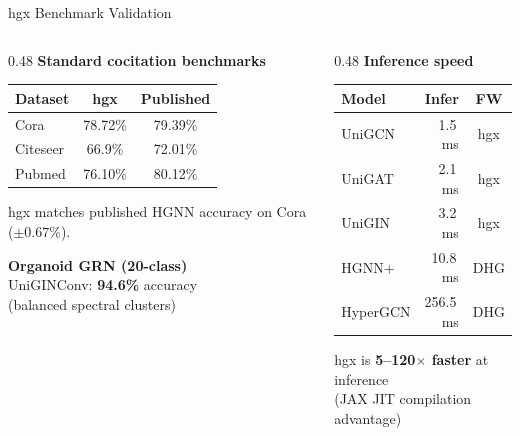 \documentclass[aspectratio=169,11pt]{beamer}
\begin{document}
\begin{frame}{hgx Benchmark Validation}

\begin{columns}[T]
\begin{column}{0.48\textwidth}
\textbf{Standard cocitation benchmarks}

\vspace{0.3em}
\begin{table}
\small
\begin{tabular}{lcc}
\toprule
\textbf{Dataset} & \textbf{hgx} & \textbf{Published} \\
\midrule
Cora & 78.72\% & 79.39\% \\
Citeseer & 66.9\% & 72.01\% \\
Pubmed & 76.10\% & 80.12\% \\
\bottomrule
\end{tabular}
\end{table}

\vspace{0.3em}
hgx matches published HGNN accuracy on Cora ($\pm 0.67$\%).

\vspace{0.5em}
\textbf{Organoid GRN (20-class)}\\
UniGINConv: \textbf{94.6\%} accuracy\\
{\small (balanced spectral clusters)}
\end{column}

\begin{column}{0.48\textwidth}
\textbf{Inference speed}

\vspace{0.3em}
\begin{table}
\small
\begin{tabular}{lrc}
\toprule
\textbf{Model} & \textbf{Infer} & \textbf{FW} \\
\midrule
UniGCN & 1.5\,ms & hgx \\
UniGAT & 2.1\,ms & hgx \\
UniGIN & 3.2\,ms & hgx \\
\midrule
HGNN+ & 10.8\,ms & DHG \\
HyperGCN & 256.5\,ms & DHG \\
\bottomrule
\end{tabular}
\end{table}

\vspace{0.3em}
hgx is \textbf{5--120$\times$ faster} at inference\\
{\small (JAX JIT compilation advantage)}
\end{column}
\end{columns}

\end{frame}
\end{document}
